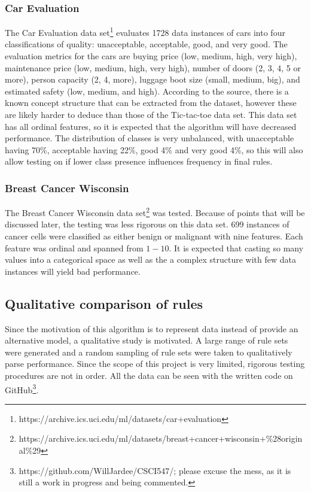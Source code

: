 \documentclass[10pt]{article}
\begin{document}
\subsubsection{Car Evaluation}
The Car Evaluation data set\footnote{https://archive.ics.uci.edu/ml/datasets/car+evaluation} evaluates 1728 data instances of cars into four classifications of quality: unacceptable, acceptable, good, and very good. The evaluation metrics for the cars are buying price (low, medium, high, very high), maintenance price (low, medium, high, very high), number of doors (2, 3, 4, 5 or more), person capacity (2, 4, more), luggage boot size (small, medium, big), and estimated safety (low, medium, and high). According to the source, there is a known concept structure that can be extracted from the dataset, however these are likely harder to deduce than those of the Tic-tac-toe data set. This data set has all ordinal features, so it is expected that the algorithm will have decreased performance. The distribution of classes is very unbalanced, with unacceptable having 70\%, acceptable having 22\%, good 4\% and very good 4\%, so this will also allow testing on if lower class presence influences frequency in final rules. 

\subsubsection{Breast Cancer Wisconsin}
The Breast Cancer Wisconsin data set\footnote{https://archive.ics.uci.edu/ml/datasets/breast+cancer+wisconsin+\%28original\%29} was tested. Because of points that will be discussed later, the testing was less rigorous on this data set. 699 instances of cancer cells were classified as either benign or malignant with nine features. Each feature was ordinal and spanned from $1-10$. It is expected that casting so many values into a categorical space as well as the a complex structure with few data instances will yield bad performance.

\subsection{Qualitative comparison of rules}
Since the motivation of this algorithm is to represent data instead of provide an alternative model, a qualitative study is motivated. A large range of rule sets were generated and a random sampling of rule sets were taken to qualitatively parse performance. Since the scope of this project is very limited, rigorous testing procedures are not in order. All the data can be seen with the written code on GitHub\footnote{https://github.com/WillJardee/CSCI547/; please excuse the mess, as it is still a work in progress and being commented.}. 
\end{document}
